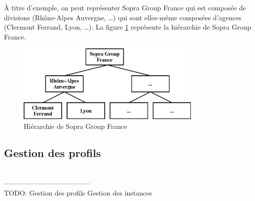 À titre d'exemple, on peut représenter Sopra Group France qui est composée de divisions (Rhône-Alpes Auvergne, \ldots) qui sont elles-même composées d'agences (Clermont Ferrand, Lyon, \ldots).
La figure \ref{hierarchie_Sopra_Group} représente la hiérarchie de Sopra Group France.
\begin{figure}[!h]
	\center
	\includegraphics[width=0.8\textwidth]{img/hierarchie_Sopra_Group.png}
	\caption{Hiérarchie de Sopra Group France}
	\label{hierarchie_Sopra_Group}
\end{figure}


\subsection{Gestion des profils}



~~\\--------------------------------------~~\\
TODO:
Gestion des profils
Gestion des instances
